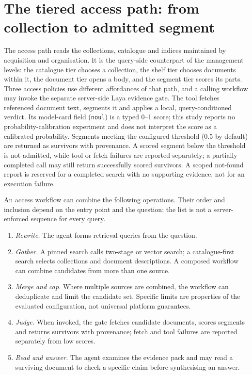 \section{The tiered access path: from collection to admitted segment}
\label{sec:retrieval}
\label{sec:lanes}

The access path reads the collections, catalogue and indices maintained by
acquisition and organisation. It is the query-side counterpart of the
management levels: the catalogue tier chooses a collection, the shelf tier
chooses documents within it, the document tier opens a body, and the segment
tier scores its parts. Three access policies use different affordances of that
path, and a calling workflow may invoke the separate server-side Laya evidence
gate. The tool fetches referenced document text, segments it and applies a
local, query-conditioned verdict. Its model-card field (\texttt{noul}) is a
typed 0--1 score; this study reports no probability-calibration experiment and
does not interpret the score as a calibrated probability. Segments meeting the
configured threshold (0.5 by default) are returned as survivors with
provenance. A scored segment below the threshold is not admitted, while tool
or fetch failures are reported separately; a partially completed call may
still return successfully scored survivors. A scoped not-found report is
reserved for a completed search with no supporting evidence, not for an
execution failure.

An access workflow can combine the following operations. Their order and
inclusion depend on the entry point and the question; the list is not a
server-enforced sequence for every query.
\begin{enumerate}
\item \emph{Rewrite.} The agent forms retrieval queries from the question.
\item \emph{Gather.} A pinned search calls two-stage or vector search; a
catalogue-first search selects collections and document descriptions. A
composed workflow can combine candidates from more than one source.
\item \emph{Merge and cap.} Where multiple sources are combined, the workflow
can deduplicate and limit the candidate set. Specific limits are properties of
the evaluated configuration, not universal platform guarantees.
\item \emph{Judge.} When invoked, the gate fetches candidate documents, scores
segments and returns survivors with provenance; fetch and tool failures are
reported separately from low scores.
\item \emph{Read and answer.} The agent examines the evidence pack and may read
a surviving document to check a specific claim before synthesising an answer.
\end{enumerate}

